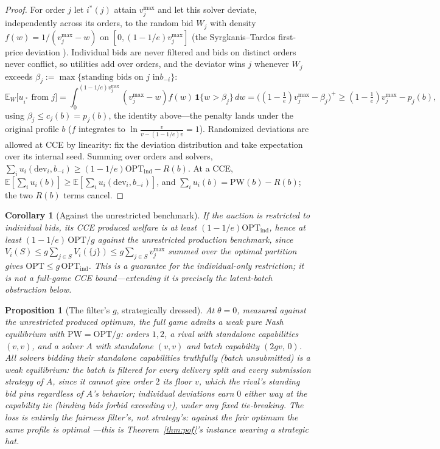 \documentclass[11pt]{article}
\newtheorem{proposition}{Proposition}
\newtheorem{corollary}{Corollary}
\theoremstyle{remark}
\newcommand{\OPT}{\mathrm{OPT}}
\newcommand{\PW}{\mathrm{PW}}
\newcommand{\E}{\mathbb{E}}
\begin{document}
\begin{proof}
For order $j$ let $i^\ast(j)$ attain $v^{\max}_j$ and let this solver
deviate, independently across its orders, to the random bid $W_j$ with
density $f(w)=1/(v^{\max}_j-w)$ on $[0,(1-1/e)v^{\max}_j]$ (the
Syrgkanis--Tardos first-price deviation \cite{syrgkanis2013}). Individual
bids are never filtered and bids on distinct orders never conflict, so
utilities add over orders, and the deviator wins $j$ whenever
$W_j$ exceeds $\beta_j:=\max\{\text{standing bids on }j\text{ in
}b_{-i}\}$:
\[
\E_W\big[u_{i^\ast}\text{ from }j\big]
=\int_{0}^{(1-1/e)v^{\max}_j}\!\!(v^{\max}_j-w)f(w)\,
\mathbf 1\{w>\beta_j\}\,dw
=\Big((1-\tfrac1e)v^{\max}_j-\beta_j\Big)^{\!+}
\ge(1-\tfrac1e)v^{\max}_j-p_j(b),
\]
using $\beta_j\le c_j(b)=p_j(b)$, the identity above---the penalty lands
under the original profile $b$ ($f$ integrates to
$\ln\frac{v}{v-(1-1/e)v}=1$). Randomized deviations are allowed at CCE
by linearity: fix the deviation distribution and take expectation over
its internal seed. Summing over orders and solvers,
$\sum_iu_i(\mathrm{dev}_i,b_{-i})\ge(1-1/e)\OPT_{\mathrm{ind}}-R(b)$.
At a CCE, $\E[\sum_iu_i(b)]\ge\E[\sum_iu_i(\mathrm{dev}_i,b_{-i})]$,
and $\sum_iu_i(b)=\PW(b)-R(b)$; the two $R(b)$ terms cancel.
\end{proof}

\begin{corollary}[Against the unrestricted benchmark]\label{cor:indpoa}
If the auction is restricted to individual bids, its CCE produced welfare
is at least $(1-1/e)\OPT_{\mathrm{ind}}$, hence at least
$(1-1/e)\,\OPT/g$ against the unrestricted production benchmark, since
$V_i(S)\le g\sum_{j\in S}V_i(\{j\})\le g\sum_{j\in S}v^{\max}_j$
summed over the optimal partition gives $\OPT\le g\,\OPT_{\mathrm{ind}}$.
This is a guarantee for the individual-only restriction; it is \emph{not}
a full-game CCE bound---extending it is precisely the latent-batch
obstruction below.
\end{corollary}

\begin{proposition}[The filter's $g$, strategically dressed]
\label{prop:poalower}
At $\theta=0$, measured against the \emph{unrestricted} produced
optimum, the full game admits a \emph{weak} pure Nash equilibrium with
$\PW=\OPT/g$: orders $1,2$, a rival with standalone capabilities
$(v,v)$, and a solver $A$ with standalone $(v,v)$ and batch capability
$(2gv,\,0)$. All solvers bidding their standalone capabilities truthfully
(batch unsubmitted) is a weak equilibrium: the batch is filtered for
every delivery split and every submission strategy of $A$, since it
cannot give order $2$ its floor $v$, which the rival's standing bid pins
regardless of $A$'s behavior; individual deviations earn $0$ either way
at the capability tie (binding bids forbid exceeding $v$), under any
fixed tie-breaking. The loss is entirely the fairness filter's, not
strategy's: against the \emph{fair} optimum the same profile is optimal
---this is Theorem~\ref{thm:pof}'s instance wearing a strategic hat.
\end{proposition}
\end{document}

